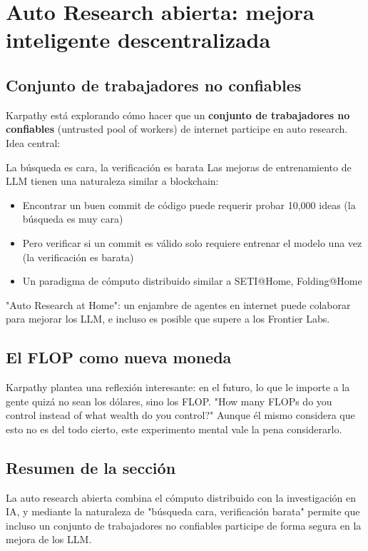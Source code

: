 \section{Auto Research abierta: mejora inteligente descentralizada}

\subsection{Conjunto de trabajadores no confiables}

Karpathy está explorando cómo hacer que un \textbf{conjunto de trabajadores no confiables} (untrusted pool of workers) de internet participe en auto research. Idea central:

\begin{importantbox}{La búsqueda es cara, la verificación es barata}
Las mejoras de entrenamiento de LLM tienen una naturaleza similar a blockchain:
\begin{itemize}
    \item Encontrar un buen commit de código puede requerir probar 10,000 ideas (la búsqueda es muy cara)
    \item Pero verificar si un commit es válido solo requiere entrenar el modelo una vez (la verificación es barata)
    \item Un paradigma de cómputo distribuido similar a SETI@Home, Folding@Home
\end{itemize}
"Auto Research at Home": un enjambre de agentes en internet puede colaborar para mejorar los LLM, e incluso es posible que supere a los Frontier Labs.
\end{importantbox}

\subsection{El FLOP como nueva moneda}

Karpathy plantea una reflexión interesante: en el futuro, lo que le importe a la gente quizá no sean los dólares, sino los FLOP. "How many FLOPs do you control instead of what wealth do you control?" Aunque él mismo considera que esto no es del todo cierto, este experimento mental vale la pena considerarlo.

\subsection{Resumen de la sección}

La auto research abierta combina el cómputo distribuido con la investigación en IA, y mediante la naturaleza de "búsqueda cara, verificación barata" permite que incluso un conjunto de trabajadores no confiables participe de forma segura en la mejora de los LLM.

